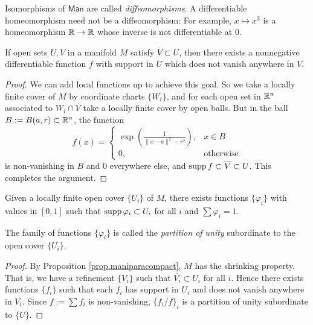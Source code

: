\begin{example}
    Isomorphisms of $\mathsf{Man}$ are called \emph{diffeomorphisms}. A differentiable homeomorphism need not be a diffeomorphism: For example, $x\mapsto x^3$ is a homeomorphism $\mathbb{R}\to\mathbb{R}$ whose inverse is not differentiable at $0$.
\end{example}

\begin{theorem}
    If open sets $U,V$ in a manifold $M$ satisfy $\overline{V}\subset U$, then there exists a nonnegative differentiable function $f$ with support in $U$ which does not vanish anywhere in $V$.
\end{theorem}

\begin{proof}
    We can add local functions up to achieve this goal. So we take a locally finite cover of $M$ by coordinate charts $\{W_i\}$, and for each open set in $\mathbb{R}^n$ associated to $W_i\cap V$ take a locally finite cover by open balls. But in the ball $B:=B(a,r)\subset\mathbb{R}^n$, the function
    $$f(x)=\begin{cases}
        \exp\left(\frac{1}{\|x-a\|^2-r^2}\right), & x\in B \\
        0, &\text{otherwise}
    \end{cases}$$
    is non-vanishing in $B$ and $0$ everywhere else, and $\operatorname{supp} f\subset\overline{V}\subset U$. This completes the argument.
\end{proof}

\begin{corollary}
    Given a locally finite open cover $\{U_i\}$ of $M$, there exists functions $\{\varphi_i\}$ with values in $[0,1]$ such that $\operatorname{supp}\varphi_i\subset U_i$ for all $i$ and $\sum\varphi_i=1$.

    The family of functions $\{\varphi_i\}$ is called the \emph{partition of unity} subordinate to the open cover $\{U_i\}$.
\end{corollary}

\begin{proof}
    By Proposition \ref{prop.maniparacompact}, $M$ has the shrinking property. That is, we have a refinement $\{V_i\}$ such that $\overline{V_i}\subset U_i$ for all $i$. Hence there exists functions $\{f_i\}$ such that each $f_i$ has support in $U_i$ and does not vanish anywhere in $V_i$. Since $f:=\sum f_i$ is non-vanishing, $\{f_i/f\}_i$ is a partition of unity subordinate to $\{U\}$.
\end{proof}

